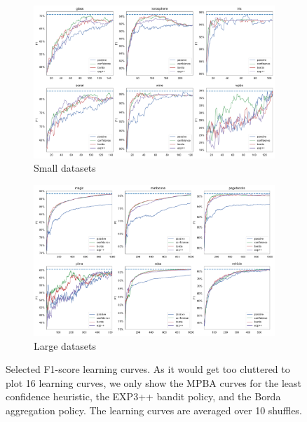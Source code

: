 \documentclass[fleqn,10pt,lineno]{wlpeerj} %
\begin{document}
\begin{figure}[tbp]
	\centering
	\begin{subfigure}[t]{\textwidth}
        \centering
        \includegraphics[width=\textwidth]{figures/learning_curves-f1-small}
        \caption{Small datasets}
	\end{subfigure}
	\begin{subfigure}[t]{\textwidth}
        \centering
        \includegraphics[width=\textwidth]{figures/learning_curves-f1-large}
        \caption{Large datasets}
    \end{subfigure}
	\caption[Selected learning curves]{Selected F1-score learning curves.
	As it would get too cluttered to plot 16 learning curves, we only show the
	MPBA curves for the least confidence heuristic, the EXP3++ bandit policy,
	and the Borda aggregation policy. The learning curves are averaged over 10
	shuffles.}
	\label{fig:learning_curves-f1}
\end{figure}
\end{document}
